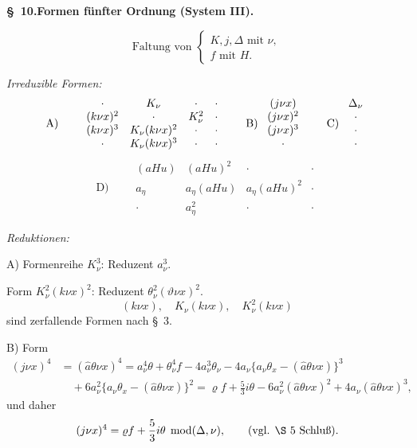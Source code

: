 \documentclass[11pt]{article}
\newcommand{\A}{\Delta}
\newcommand{\R}{\varrho}
\newcommand{\hata}{\widehat{a}}
\newcommand{\modu}[1]{\;\operatorname{mod} #1}
\providecommand{\modu}[1]{\;\operatorname{mod} #1}
\begin{document}
\begin{center}
\textbf{\S\ 10.\quad Formen fünfter Ordnung (System III).}
\end{center}

\[
\text{Faltung von }\left\{\begin{array}{l}
K,j,\A \text{ mit }\nu,\\
f\text{ mit }H.
\end{array}\right.
\]

\noindent\emph{Irreduzible Formen:}
\[
\begin{array}{c@{\qquad}c@{\qquad}c@{\qquad}c}
\text{A)} & \begin{array}{cccc}
\cdot&K_\nu&\cdot&\cdot\\
(k\nu x)^2&\cdot&K_\nu^2&\cdot\\
(k\nu x)^3&K_\nu(k\nu x)^2&\cdot&\cdot\\
\cdot&K_\nu(k\nu x)^3&\cdot&\cdot
\end{array}
&
\text{B)}\ \begin{array}{c}(j\nu x)\\(j\nu x)^2\\(j\nu x)^3\\ \cdot\end{array}
&
\text{C)}\ \begin{array}{c}\A_\nu\\\cdot\\\cdot\\\cdot\end{array}
\end{array}
\]
\[
\text{D)}\qquad
\begin{array}{cccc}
(aHu)&(aHu)^2&\cdot&\cdot\\
a_\eta&a_\eta(aHu)&a_\eta(aHu)^2&\cdot\\
\cdot&a_\eta^2&\cdot&\cdot
\end{array}
\]

\noindent\emph{Reduktionen:}

\noindent A) Formenreihe $K_\nu^3$: Reduzent $a_\nu^3$.

Form $K_\nu^2(k\nu x)^2$: Reduzent $\theta_\nu^2(\vartheta\nu x)^2$.
\[
(k\nu x),\quad K_\nu(k\nu x),\quad K_\nu^2(k\nu x)
\]
sind zerfallende Formen nach \S\ 3.

\noindent B) Form
\[
\begin{aligned}
(j\nu x)^4&=(\hata\theta\nu x)^4
=a_\nu^4\theta+\theta_\nu^4 f-4a_\nu^3\theta_\nu
-4a_\nu\{a_\nu\theta_x-(\hata\theta\nu x)\}^3\\
&\quad+6a_\nu^2\{a_\nu\theta_x-(\hata\theta\nu x)\}^2
=\R f+\frac53 i\theta-6a_\nu^2(\hata\theta\nu x)^2
+4a_\nu(\hata\theta\nu x)^3,
\end{aligned}
\]
und daher
\[
(j\nu x)^4=\R f+\frac53 i\theta\modu{(\A,\nu)},\qquad (\text{vgl. \S\ 5 Schluß}).
\]
\end{document}
